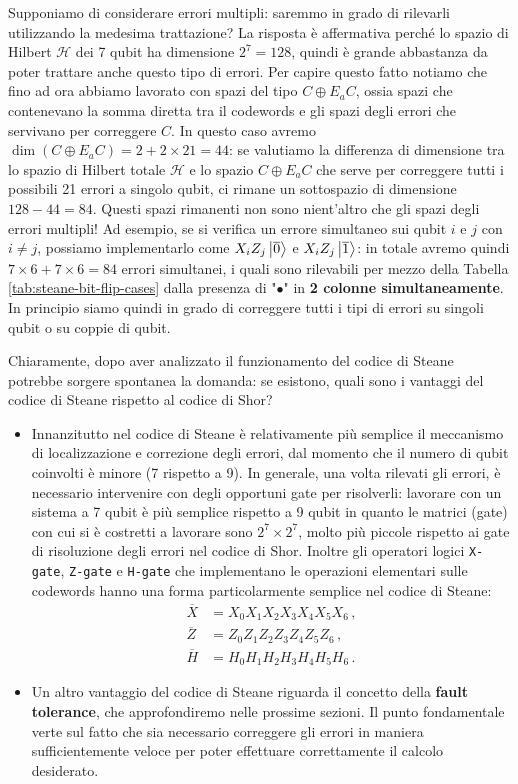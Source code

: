 \noindent Supponiamo di considerare errori multipli: saremmo in grado di rilevarli utilizzando la medesima trattazione? La risposta è affermativa perché lo spazio di Hilbert $\mathcal{H}$ dei 7 qubit ha dimensione $2^7= 128$, quindi è grande abbastanza da poter trattare anche questo tipo di errori. Per capire questo fatto notiamo che fino ad ora abbiamo lavorato con spazi del tipo $C\oplus E_a C$, ossia spazi che contenevano la somma diretta tra il codewords e gli spazi degli errori che servivano per correggere $C$. In questo caso avremo $\dim (C\oplus E_a C) = 2+2\times21=44$: se valutiamo la differenza di dimensione tra lo spazio di Hilbert totale $\mathcal{H}$ e lo spazio $C\oplus E_a C$ che serve per correggere tutti i possibili 21 errori a singolo qubit, ci rimane un sottospazio di dimensione $128-44 = 84$. Questi spazi rimanenti non sono nient'altro che gli spazi degli errori multipli! Ad esempio,  se si verifica  un errore simultaneo sui qubit $i$ e $j$ con $i \neq j$, possiamo implementarlo come $X_i Z_j \ket{\overline 0}$ e $X_i Z_j \ket{\overline 1}$: in totale avremo quindi $7 \times 6 + 7 \times 6 = 84$ errori simultanei, i quali sono rilevabili per mezzo della Tabella \ref{tab:steane-bit-flip-cases} dalla presenza di "$\bullet$" in \textbf{2 colonne simultaneamente}. In principio siamo quindi in grado di correggere tutti i tipi di errori su singoli qubit o su coppie di qubit.

\noindent Chiaramente, dopo aver analizzato il funzionamento del codice di Steane potrebbe sorgere spontanea la domanda: se esistono, quali sono i vantaggi del codice di Steane rispetto al codice di Shor?
\begin{itemize}
    \item Innanzitutto nel codice di Steane è relativamente più semplice il meccanismo di localizzazione e correzione degli errori, dal momento che il numero di qubit coinvolti è minore (7 rispetto a 9). In generale, una volta rilevati gli errori, è necessario intervenire con degli opportuni gate per risolverli: lavorare con un sistema a 7 qubit è più semplice rispetto a 9 qubit in quanto le matrici (gate) con cui si è costretti a lavorare sono $2^7\times 2^7$, molto più piccole rispetto ai gate di risoluzione degli errori nel codice di Shor. 
    Inoltre gli operatori  logici \texttt{X-gate}, \texttt{Z-gate} e \texttt{H-gate} che implementano le operazioni elementari sulle codewords hanno una forma particolarmente semplice nel codice di Steane:
    \begin{align*}
        \overline X &= X_0X_1X_2X_3X_4X_5X_6 \, , \\
        \overline Z &= Z_0Z_1Z_2Z_3Z_4Z_5Z_6 \, , \\
        \overline H &= H_0H_1H_2H_3H_4H_5H_6 \, .
    \end{align*}
    
    \item Un altro vantaggio del codice di Steane riguarda il concetto della \textbf{fault tolerance}, che approfondiremo nelle prossime sezioni. Il punto  fondamentale verte sul fatto che sia necessario correggere gli errori in maniera sufficientemente veloce per poter effettuare correttamente il calcolo desiderato.
\end{itemize}

